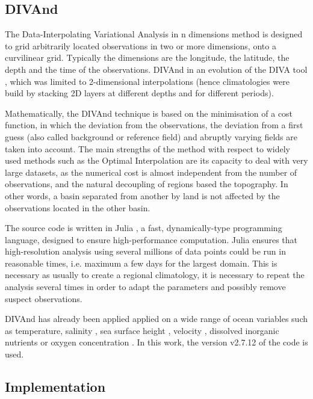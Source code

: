 \documentclass[essd, manuscript]{copernicus}
\begin{document}
\subsection{DIVAnd\label{sec:divandmethod}}

The Data-Interpolating Variational Analysis in n dimensions method \citep[DIVAnd][]{BARTH2014} is designed to grid arbitrarily located observations in two or more dimensions, onto a curvilinear grid. Typically the dimensions are the longitude, the latitude, the depth and the time of the observations. DIVAnd in an evolution of the DIVA tool \citep{TROUPIN2012,BECKERS2014}, which was limited to 2-dimensional interpolations (hence climatologies were build by stacking 2D layers at different depths and for different periods). 

Mathematically, the DIVAnd technique is based on the minimisation of a cost function, in which the deviation from the observations, the deviation from a first guess (also called background or reference field) and abruptly varying fields are taken into account. The main strengths of the method with respect to widely used methods such as the Optimal Interpolation \citep[OI,][]{GANDIN1966,BRETHERTON1976} are its capacity to deal with very large datasets, as the numerical cost is almost independent from the number of observations, and the natural decoupling of regions based the topography. In other words, a basin separated from another by land is not affected by the observations located in the other basin.

The source code is written in Julia \citep{Bezanson2017}, a fast, dynamically-type programming language, designed to ensure high-performance computation. Julia ensures that high-resolution analysis using several millions of data points could be run in reasonable times, i.e. maximum a few days for the largest domain. This is necessary as usually to create a regional climatology, it is necessary to repeat the analysis several times in order to adapt the parameters and possibly remove suspect observations.

DIVAnd has already been applied applied on a wide range of ocean variables such as temperature, salinity \citep{COATANOAN2021}, sea surface height \citep{DOGLIONI2023}, velocity \citep{TROUPIN2022}, dissolved inorganic nutrients \citep{BELGACEM2021} or oxygen concentration \citep{CLIMATO2023}. In this work, the version v2.7.12 of the code \citep{BARTH2024DIVAnd} is used.

\subsection{Implementation}
\end{document}

